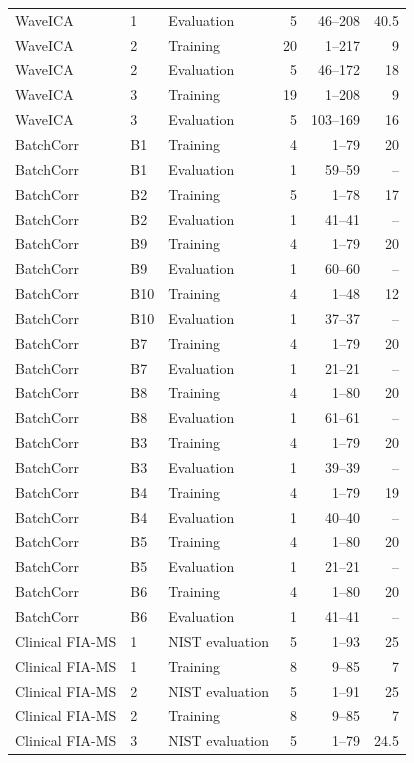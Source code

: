 \begin{longtable}{lllrrr}
WaveICA & 1 & Evaluation & 5 & 46--208 & 40.5 \\
WaveICA & 2 & Training & 20 & 1--217 & 9 \\
WaveICA & 2 & Evaluation & 5 & 46--172 & 18 \\
WaveICA & 3 & Training & 19 & 1--208 & 9 \\
WaveICA & 3 & Evaluation & 5 & 103--169 & 16 \\
BatchCorr & B1 & Training & 4 & 1--79 & 20 \\
BatchCorr & B1 & Evaluation & 1 & 59--59 & -- \\
BatchCorr & B2 & Training & 5 & 1--78 & 17 \\
BatchCorr & B2 & Evaluation & 1 & 41--41 & -- \\
BatchCorr & B9 & Training & 4 & 1--79 & 20 \\
BatchCorr & B9 & Evaluation & 1 & 60--60 & -- \\
BatchCorr & B10 & Training & 4 & 1--48 & 12 \\
BatchCorr & B10 & Evaluation & 1 & 37--37 & -- \\
BatchCorr & B7 & Training & 4 & 1--79 & 20 \\
BatchCorr & B7 & Evaluation & 1 & 21--21 & -- \\
BatchCorr & B8 & Training & 4 & 1--80 & 20 \\
BatchCorr & B8 & Evaluation & 1 & 61--61 & -- \\
BatchCorr & B3 & Training & 4 & 1--79 & 20 \\
BatchCorr & B3 & Evaluation & 1 & 39--39 & -- \\
BatchCorr & B4 & Training & 4 & 1--79 & 19 \\
BatchCorr & B4 & Evaluation & 1 & 40--40 & -- \\
BatchCorr & B5 & Training & 4 & 1--80 & 20 \\
BatchCorr & B5 & Evaluation & 1 & 21--21 & -- \\
BatchCorr & B6 & Training & 4 & 1--80 & 20 \\
BatchCorr & B6 & Evaluation & 1 & 41--41 & -- \\
Clinical FIA-MS & 1 & NIST evaluation & 5 & 1--93 & 25 \\
Clinical FIA-MS & 1 & Training & 8 & 9--85 & 7 \\
Clinical FIA-MS & 2 & NIST evaluation & 5 & 1--91 & 25 \\
Clinical FIA-MS & 2 & Training & 8 & 9--85 & 7 \\
Clinical FIA-MS & 3 & NIST evaluation & 5 & 1--79 & 24.5 \\

\end{longtable}
